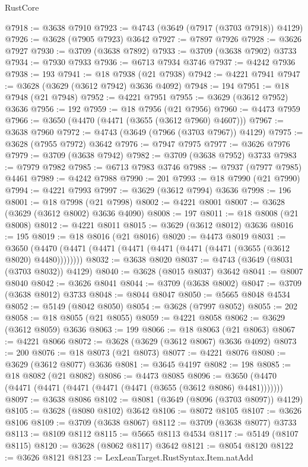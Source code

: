 \begin{lexlean}{RustCore}
\begin{coremodule}
@7918 := @3638 @7910
@7923 := @4743 (@3649 (@7917 (@3703 @7918)) @4129)
@7926 := @3628 (@7905 @7923) @3642
@7927 := @7897 @7926
@7928 := @3626 @7927
@7930 := @3709 (@3638 @7892)
@7933 := @3709 (@3638 @7902) @3733
@7934 := @7930 @7933
@7936 := @6713 @7934 @3746
@7937 := @4242 @7936
@7938 := 193
@7941 := @18 @7938 (@21 @7938)
@7942 := @4221 @7941
@7947 := @3628 (@3629 (@3612 @7942) @3636 @4092)
@7948 := 194
@7951 := @18 @7948 (@21 @7948)
@7952 := @4221 @7951
@7955 := @3629 (@3612 @7952) @3636
@7956 := 192
@7959 := @18 @7956 (@21 @7956)
@7960 := @4473 @7959
@7966 := @3650 (@4470 (@4471 (@3655 (@3612 @7960) @4607)))
@7967 := @3638 @7960
@7972 := @4743 (@3649 (@7966 (@3703 @7967)) @4129)
@7975 := @3628 (@7955 @7972) @3642
@7976 := @7947 @7975
@7977 := @3626 @7976
@7979 := @3709 (@3638 @7942)
@7982 := @3709 (@3638 @7952) @3733
@7983 := @7979 @7982
@7985 := @6713 @7983 @3746
@7988 := @7937 (@7977 @7985) @4461
@7989 := @4242 @7988
@7990 := 201
@7993 := @18 @7990 (@21 @7990)
@7994 := @4221 @7993
@7997 := @3629 (@3612 @7994) @3636
@7998 := 196
@8001 := @18 @7998 (@21 @7998)
@8002 := @4221 @8001
@8007 := @3628 (@3629 (@3612 @8002) @3636 @4090)
@8008 := 197
@8011 := @18 @8008 (@21 @8008)
@8012 := @4221 @8011
@8015 := @3629 (@3612 @8012) @3636
@8016 := 195
@8019 := @18 @8016 (@21 @8016)
@8020 := @4473 @8019
@8031 := @3650 (@4470 (@4471 (@4471 (@4471 (@4471 (@4471 (@4471 (@3655 (@3612 @8020) @4480))))))))
@8032 := @3638 @8020
@8037 := @4743 (@3649 (@8031 (@3703 @8032)) @4129)
@8040 := @3628 (@8015 @8037) @3642
@8041 := @8007 @8040
@8042 := @3626 @8041
@8044 := @3709 (@3638 @8002)
@8047 := @3709 (@3638 @8012) @3733
@8048 := @8044 @8047
@8050 := @5665 @8048 @4534
@8052 := @5149 (@8042 @8050)
@8054 := @3628 (@7997 @8052)
@8055 := 202
@8058 := @18 @8055 (@21 @8055)
@8059 := @4221 @8058
@8062 := @3629 (@3612 @8059) @3636
@8063 := 199
@8066 := @18 @8063 (@21 @8063)
@8067 := @4221 @8066
@8072 := @3628 (@3629 (@3612 @8067) @3636 @4092)
@8073 := 200
@8076 := @18 @8073 (@21 @8073)
@8077 := @4221 @8076
@8080 := @3629 (@3612 @8077) @3636
@8081 := @3645 @4197
@8082 := 198
@8085 := @18 @8082 (@21 @8082)
@8086 := @4473 @8085
@8096 := @3650 (@4470 (@4471 (@4471 (@4471 (@4471 (@4471 (@3655 (@3612 @8086) @4481)))))))
@8097 := @3638 @8086
@8102 := @8081 (@3649 (@8096 (@3703 @8097)) @4129)
@8105 := @3628 (@8080 @8102) @3642
@8106 := @8072 @8105
@8107 := @3626 @8106
@8109 := @3709 (@3638 @8067)
@8112 := @3709 (@3638 @8077) @3733
@8113 := @8109 @8112
@8115 := @5665 @8113 @4534
@8117 := @5149 (@8107 @8115)
@8120 := @3628 (@8062 @8117) @3642
@8121 := @8054 @8120
@8122 := @3626 @8121
@8123 := LexLeanTarget.RustSyntax.Item.natAdd

\end{coremodule}
\end{lexlean}
